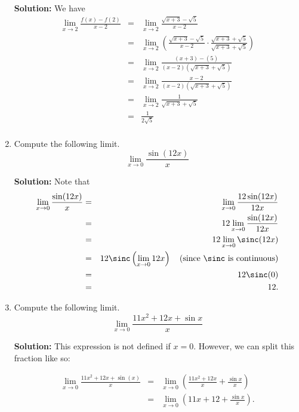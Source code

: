 \documentclass{article}
\begin{document}
\begin{enumerate}
\textbf{Solution:} We have
\begin{eqnarray*}
\lim_{x \rightarrow 2} \frac{f(x) - f(2)}{x - 2} & = & \lim_{x \rightarrow 2} \frac{\sqrt{x + 3} - \sqrt{5}}{x - 2} \\
 & = & \lim_{x \rightarrow 2} \left( \frac{\sqrt{x + 3} - \sqrt{5}}{x - 2} \cdot \frac{\sqrt{x + 3} + \sqrt{5}}{\sqrt{x + 3} + \sqrt{5}} \right) \\
 & = & \lim_{x \rightarrow 2} \frac{(x + 3) - (5)}{(x - 2)\left( \sqrt{x + 3} + \sqrt{5} \right)} \\
 & = & \lim_{x \rightarrow 2} \frac{x - 2}{(x - 2)\left( \sqrt{x + 3} + \sqrt{5} \right)} \\
 & = & \lim_{x \rightarrow 2} \frac{1}{\sqrt{x + 3} + \sqrt{5}} \\
 & = & \frac{1}{2\sqrt{5}} \\
\end{eqnarray*}


  
\vspace{1cm}

\item Compute the following limit. \[ \lim_{x \rightarrow 0} \frac{\sin(12 x)}{x} \]

\textbf{Solution:} Note that
\begin{eqnarray*}
\lim_{x \rightarrow 0} \frac{\sin(12 x)}{x}
 & = & \lim_{x \rightarrow 0} \frac{12\sin(12 x)}{12 x} \\
 & = & 12 \lim_{x \rightarrow 0} \frac{\sin(12 x)}{12 x} \\
 & = & 12 \lim_{x \rightarrow 0} \sinc(12 x) \\
 & = & 12 \sinc\left( \lim_{x \rightarrow 0} 12 x \right) \quad \mathrm{(since}\ \sinc\ \mathrm{is\ continuous)} \\
 & = & 12 \sinc(0) \\
 & = & 12.
\end{eqnarray*}


  
\vspace{1cm}

\item Compute the following limit. \[ \lim_{x \rightarrow 0} \frac{11 x^2 + 12 x + \sin x}{x} \]

\textbf{Solution:} This expression is not defined if $x = 0$. However, we can split this fraction like so:

\begin{eqnarray*}
\lim_{x \rightarrow 0} \frac{11 x^2 + 12 x + \sin(x)}{x}
 & = & \lim_{x \rightarrow 0} \left( \frac{11 x^2 + 12 x}{x} + \frac{\sin x}{x} \right) \\
 & = & \lim_{x \rightarrow 0} \left( 11 x + 12 + \frac{\sin x}{x} \right). \\
\end{eqnarray*}


\end{enumerate}
\end{document}
